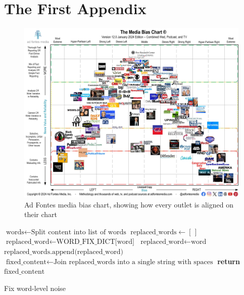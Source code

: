 \chapter{The First Appendix}
\label{app:A}


\begin{figure}[htbp]
    \centering
    \includegraphics[width=1\linewidth]{images/Media-Bias-Chart-12.0_Jan-2024-Licensed-scaled.jpg}
    \caption{Ad Fontes media bias chart, showing how every outlet is aligned on their chart}
    \label{fig:adfontes-media-bias-chart}
\end{figure}


\begin{algorithm}
    \begin{algorithmic}[1]
        \State $\text{words} \gets \text{Split content into list of words}$ 
        \State $\text{replaced\_words} \gets [\,]$
        \State $\text{replaced\_word} \gets \text{WORD\_FIX\_DICT[word]}$ 
        \State $\text{replaced\_word} \gets \text{word}$ 
        \EndIf
        \State $\text{replaced\_words.append(replaced\_word)}$
        \EndFor
        \State $\text{fixed\_content} \gets \text{Join replaced\_words into a single string with spaces}$
        \State \textbf{return} $\text{fixed\_content}$
        \EndProcedure
    \end{algorithmic}
    \caption{Fix word-level noise}
    \label{alg:word_level_noise_fix}
\end{algorithm}

